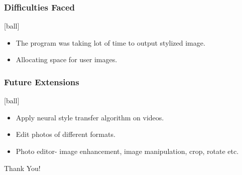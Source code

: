 \documentclass[14pt]{beamer}
\begin{document}
\begin{frame}
		\frametitle{Difficulties Faced}
        \begin{itemize}

				\item The program was taking lot of time to output stylized image.
                \item Allocating space for user images.
		\end{itemize}
\end{frame}

\begin{frame}
    \frametitle{Future Extensions}
    [ball]
    \begin{itemize}
    \item Apply neural style transfer algorithm on videos.
    \item Edit photos of different formats.
    \item Photo editor- image enhancement, image manipulation, crop, rotate etc.
    \end{itemize}
\end{frame}

\begin{frame}
    \begin{center}  
       \Huge Thank You!
    \end{center}
\end{frame}
\end{document}
